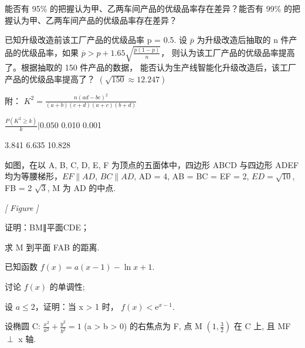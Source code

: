 \documentclass[UTF8,12pt]{ctexart}
\newcommand{\examfigure}[3]{%
  \parbox[c][#2cm][c]{#1cm}{\centering\small\textit{[ #3 ]}}}
\begin{document}
\begin{questions}[start=17]
\begin{subquestions}
      能否有 95\% 的把握认为甲、乙两车间产品的优级品率存在差异？能否有 99\%
        的把握认为甲、乙两车间产品的优级品率存在差异？
      \item
      已知升级改造前该工厂产品的优级品率 p = 0.5. 设 $\overline{p}$ 为升级改造后抽取的 n
        件产品的优级品率，如果 $\overline{p} > p + 1.65\sqrt{\frac{p(1 - p)}{n}}$，
        则认为该工厂产品的优级品率提高了。根据抽取的 150 件产品的数据，
        能否认为生产线智能化升级改造后，该工厂产品的优级品率提高了？
        $(\sqrt{150} \approx 12.247)$
    \end{subquestions}

    附： $K^{2} = \frac{n(ad - bc)^{2}}{(a + b)(c + d)(a + c)(b + d)}$

    $\frac{P(K^{2} \geq k)}{k}  | 0.050$ 0.010 0.001

    3.841 6.635 10.828

  \item 如图，在以 A, B, C, D, E, F 为顶点的五面体中，四边形 ABCD 与四边形 ADEF
    均为等腰梯形，$EF \parallel AD$, $BC \parallel AD$, AD = 4, AB = BC = EF = 2,
    $ED =   \sqrt{10}$, FB = 2 $\sqrt{3}$, M 为 AD 的中点.

    \begin{center}
      \examfigure{6.2}{5.8}{Figure}
    \end{center}

    \begin{subquestions}
      \item
      证明：BM∥平面CDE；
      \item
      求 M 到平面 FAB 的距离.
    \end{subquestions}

  \item 已知函数 $f(x) = a(x - 1) - \ln x + 1$.

    \begin{subquestions}
      \item
      讨论 $f(x)$ 的单调性;
      \item
      设 $a \leqslant 2$，证明：当 x > 1 时， $f(x) < \mathrm{e}^{x-1}$.
    \end{subquestions}

  \item 设椭圆 C: $\frac{x^{2}}{a^{2}}+\frac{y^{2}}{b^{2}}=1$ (a > b > 0) 的右焦点为 F,
    点 M $\left(1,\frac{3}{2}\right)$ 在 C 上, 且 MF $\perp$ x 轴.


\end{questions}
\end{document}
